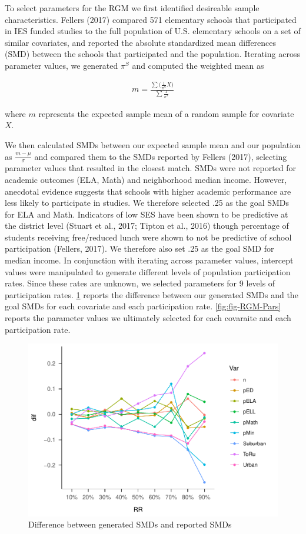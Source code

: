 \documentclass[man,floatsintext]{apa6}
\begin{document}
To select parameters for the RGM we first identified desireable sample characteristics. Fellers (2017) compared 571 elementary schools that participated in IES funded studies to the full population of U.S. elementary schools on a set of similar covariates, and reported the absolute standardized mean differences (SMD) between the schools that participated and the population. Iterating across parameter values, we generated \(\pi^S\) and computed the weighted mean as

\begin{align}
  m = \frac{\sum{(\frac{1}{\pi^S} X})}{\sum{\frac{1}{\pi^S}}}
\end{align}

where \(m\) represents the expected sample mean of a random sample for covariate \(X\).

We then calculated SMDs between our expected sample mean and our population as \(\frac{m - \mu}{\sigma}\) and compared them to the SMDs reported by Fellers (2017), selecting parameter values that resulted in the closest match. SMDs were not reported for academic outcomes (ELA, Math) and neighborhood median income. However, anecdotal evidence suggests that schools with higher academic performance are less likely to participate in studies. We therefore selected .25 as the goal SMDs for ELA and Math. Indicators of low SES have been shown to be predictive at the district level (Stuart et al., 2017; Tipton et al., 2016) though percentage of students receiving free/reduced lunch were shown to not be predictive of school participation (Fellers, 2017). We therefore also set .25 as the goal SMD for median income.
In conjunction with iterating across parameter values, intercept values were manipulated to generate different levels of population participation rates. Since these rates are unknown, we selected parameters for 9 levels of participation rates. \ref{fig:fig-SMD-goal} reports the difference between our generated SMDs and the goal SMDs for each covariate and each participation rate. \ref{fig:fig-RGM-Pars} reports the parameter values we ultimately selected for each covaraite and each participation rate.

\begin{figure}
\centering
\includegraphics{GenSamp_Paper_files/figure-latex/fig-SMD-goal-1.pdf}
\caption{\label{fig:fig-SMD-goal}Difference between generated SMDs and reported SMDs}
\end{figure}
\end{document}
